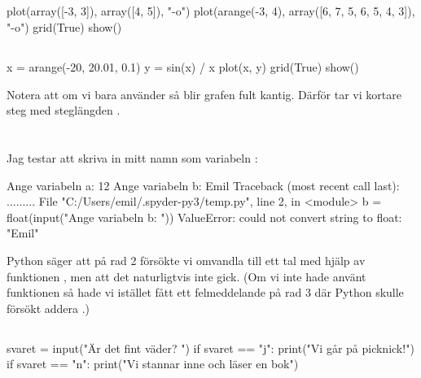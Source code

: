 \subsection*{}
\vspace{3pt}
\begin{python}
plot(array([-3, 3]), array([4, 5]), "-o")
plot(arange(-3, 4), array([6, 7, 5, 6, 5, 4, 3]), "-o")
grid(True)
show()
\end{python}

\subsection*{}
\vspace{3pt}
\begin{python}
x = arange(-20, 20.01, 0.1)
y = sin(x) / x
plot(x, y)
grid(True)
show()
\end{python}
Notera att om vi bara använder  så blir grafen fult kantig. Därför tar vi kortare steg med steglängden .


\section*{}

\subsection*{}
Jag testar att skriva in mitt namn som variabeln :
\vspace{10pt}
\begin{python}
Ange variabeln a: 12
Ange variabeln b: Emil
Traceback (most recent call last):
  .........
  File "C:/Users/emil/.spyder-py3/temp.py", line 2, in <module>
    b = float(input("Ange variabeln b: "))
ValueError: could not convert string to float: "Emil"
\end{python}
Python säger att på rad 2 försökte vi omvandla  till ett tal med hjälp av funktionen , men att det naturligtvis inte gick. (Om vi inte hade använt funktionen  så hade vi istället fått ett felmeddelande på rad 3 där Python skulle försökt addera .)
\newpage
\subsection*{}
\vspace{3pt}
\begin{python}
svaret = input("Är det fint väder? ")
if svaret == "j":
    print("Vi går på picknick!")
if svaret == "n":
    print("Vi stannar inne och läser en bok")
\end{python}

